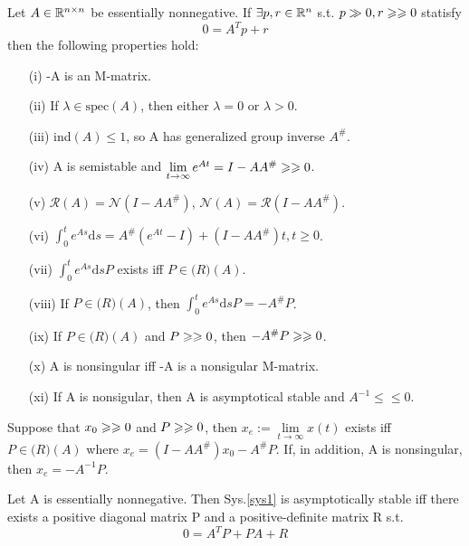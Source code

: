 \documentclass{paper}
\begin{document}
\begin{thm}
Let $A\in \mathbb{R}^{n\times n}$ be essentially nonnegative. If $\exists p,r \in\mathbb{R}^{n}$ s.t. $p\gg 0, r\geqslant\geqslant 0$
statisfy 
\begin{equation}\label{en_cond}
0=A^Tp+r
\end{equation}
then the following properties hold:
\begin{enumerate}
\item[(i)]    -A is an M-matrix.
\item[(ii)]   If $\lambda\in\mathrm{spec}(A)$, then either $\lambda=0$ or $\lambda>0$.
\item[(iii)]  ind$(A)\leqslant 1$, so A has generalized group inverse $A^\#$.
\item[(iv)]   A is semistable and $\lim\limits_{t\rightarrow\infty}e^{At}=I-AA^{\#}\geqslant\geqslant 0$.
\item[(v)]    $\mathcal{R}(A)=\mathcal{N}(I-AA^{\#})$, $\mathcal{N}(A)=\mathcal{R}(I-AA^{\#})$.
\item[(vi)]   $\int_{0}^{t}e^{As}\mathrm{d}s=A^\#(e^{At}-I)+(I-AA^\#)t,t\geqslant 0$.
\item[(vii)]  $\int_{0}^{t}e^{As}\mathrm{d}sP$ exists iff $P\in\mathcal(R)(A)$.
\item[(viii)] If $P\in\mathcal(R)(A)$, then  $\int_{0}^{t}e^{As}\mathrm{d}sP=-A^\#P$.
\item[(ix)]   If $P\in\mathcal(R)(A)$ and $P\geqslant\geqslant 0$, then $-A^\#P\geqslant\geqslant 0$.
\item[(x)]    A is nonsingular iff -A is a nonsigular M-matrix.
\item[(xi)]   If A is nonsigular, then A is asymptotical stable and $A^{-1}\leqslant\leqslant 0$.
\end{enumerate}
\end{thm}
\begin{prop}
Suppose that $x_0\geqslant\geqslant 0$ and $P\geqslant\geqslant 0$, then $x_e:=\lim\limits_{t\rightarrow \infty}x(t)$ exists
iff $P\in\mathcal(R)(A)$ where $x_e=(I-AA^\#)x_0-A^\#P$. If, in addition, A is nonsingular, then
$x_e=-A^{-1}P$.
\end{prop}
\begin{thm}
Let A is essentially nonnegative. Then Sys.\ref{sys1} is asymptotically stable iff there exists a 
positive diagonal matrix P and a positive-definite matrix R s.t. 
\begin{equation}
0=A^TP+PA+R
\end{equation}
\end{thm}
\end{document}
